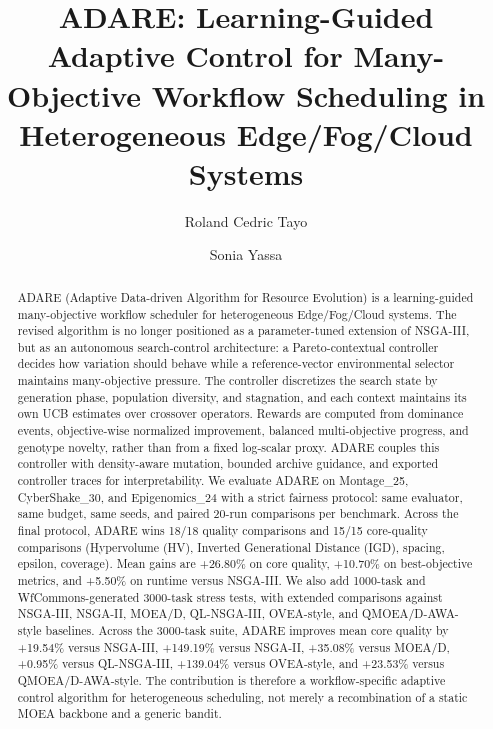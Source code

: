 \documentclass[runningheads]{llncs}
\title{ADARE: Learning-Guided Adaptive Control for Many-Objective Workflow Scheduling in Heterogeneous Edge/Fog/Cloud Systems}
\author{Roland Cedric Tayo \and Sonia Yassa}
\institute{CY Cergy Paris University, France \\
\email{rolandcedric.tayo@yahoo.fr, sonia.yassa@cyu.fr}}
\begin{document}
\maketitle

\begin{abstract}
\begin{sloppypar}
ADARE (Adaptive Data-driven Algorithm for Resource Evolution) is a learning-guided many-objective workflow scheduler for heterogeneous Edge/Fog/Cloud systems. The revised algorithm is no longer positioned as a parameter-tuned extension of NSGA-III, but as an autonomous search-control architecture: a Pareto-contextual controller decides how variation should behave while a reference-vector environmental selector maintains many-objective pressure. The controller discretizes the search state by generation phase, population diversity, and stagnation, and each context maintains its own UCB estimates over crossover operators. Rewards are computed from dominance events, objective-wise normalized improvement, balanced multi-objective progress, and genotype novelty, rather than from a fixed log-scalar proxy. ADARE couples this controller with density-aware mutation, bounded archive guidance, and exported controller traces for interpretability. We evaluate ADARE on Montage\_25, CyberShake\_30, and Epigenomics\_24 with a strict fairness protocol: same evaluator, same budget, same seeds, and paired 20-run comparisons per benchmark. Across the final protocol, ADARE wins 18/18 quality comparisons and 15/15 core-quality comparisons (Hypervolume (HV), Inverted Generational Distance (IGD), spacing, epsilon, coverage). Mean gains are +26.80\% on core quality, +10.70\% on best-objective metrics, and +5.50\% on runtime versus NSGA-III. We also add 1000-task and WfCommons-generated 3000-task stress tests, with extended comparisons against NSGA-III, NSGA-II, MOEA/D, QL-NSGA-III, OVEA-style, and QMOEA/D-AWA-style baselines. Across the 3000-task suite, ADARE improves mean core quality by +19.54\% versus NSGA-III, +149.19\% versus NSGA-II, +35.08\% versus MOEA/D, +0.95\% versus QL-NSGA-III, +139.04\% versus OVEA-style, and +23.53\% versus QMOEA/D-AWA-style. The contribution is therefore a workflow-specific adaptive control algorithm for heterogeneous scheduling, not merely a recombination of a static MOEA backbone and a generic bandit.
\end{sloppypar}
\end{abstract}
\end{document}
